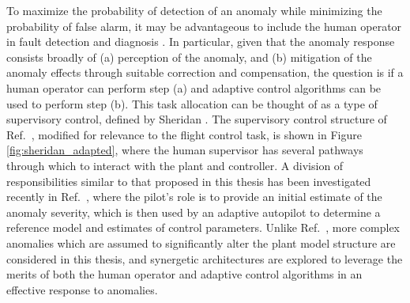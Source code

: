 To maximize the probability of detection of an anomaly while minimizing the probability of false alarm, it may be advantageous to include the human operator in fault detection and diagnosis \cite{sheridan2000human}. In particular, given that the anomaly response consists broadly of (a) perception of the anomaly, and (b) mitigation of the anomaly effects through suitable correction and compensation, the question is if a human operator can perform step (a) and adaptive control algorithms can be used to perform step (b). This task allocation can be thought of as a type of supervisory control, defined by Sheridan \cite{sheridan1976toward, sheridan2011adaptive}. The supervisory control structure of Ref.~\cite{sheridan2011adaptive}, modified for relevance to the flight control task, is shown in Figure \ref{fig:sheridan_adapted}, where the human supervisor has several pathways through which to interact with the plant and controller. A division of responsibilities similar to that proposed in this thesis has been investigated recently in Ref.~\cite{farjadian2017bumpless}, where the pilot's role is to provide an initial estimate of the anomaly severity, which is then used by an adaptive autopilot to determine a reference model and estimates of control parameters. Unlike Ref.~\cite{farjadian2017bumpless}, more complex anomalies which are assumed to significantly alter the plant model structure are considered in this thesis, and synergetic architectures are explored to leverage the merits of both the human operator and adaptive control algorithms in an effective response to anomalies.

